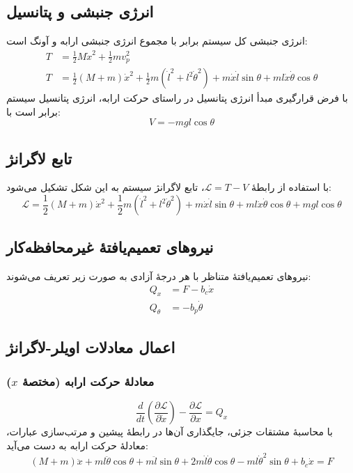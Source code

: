 \subsection{انرژی جنبشی و پتانسیل}

انرژی جنبشی کل سیستم برابر با مجموع انرژی جنبشی ارابه و آونگ است:
\begin{align*}
    T & = \frac{1}{2}M\dot{x}^2 + \frac{1}{2}m v_p^2                                                                                                          \\
    T & = \frac{1}{2}(M+m)\dot{x}^2 + \frac{1}{2}m \left( \dot{l}^2 + l^2\dot{\theta}^2 \right) + m\dot{x}\dot{l}\sin\theta + ml\dot{x}\dot{\theta}\cos\theta
\end{align*}
با فرض قرارگیری مبدأ انرژی پتانسیل در راستای حرکت ارابه، انرژی پتانسیل سیستم برابر است با:
\[
    V = -mgl\cos\theta
\]

\subsection{تابع لاگرانژ}

با استفاده از رابطهٔ $\mathcal{L} = T - V$، تابع لاگرانژ سیستم به این شکل تشکیل می‌شود:
\[
    \mathcal{L} = \frac{1}{2}(M+m)\dot{x}^2 + \frac{1}{2}m(\dot{l}^2 + l^2\dot{\theta}^2) + m\dot{x}\dot{l}\sin\theta + ml\dot{x}\dot{\theta}\cos\theta + mgl\cos\theta
\]

\subsection{نیروهای تعمیم‌یافتهٔ غیرمحافظه‌کار}
نیروهای تعمیم‌یافتهٔ متناظر با هر درجهٔ آزادی به صورت زیر تعریف می‌شوند:
\begin{align*}
    Q_x      & = F - b_c\dot{x}   \\
    Q_\theta & = -b_p\dot{\theta}
\end{align*}

\subsection{اعمال معادلات اویلر-لاگرانژ}

\subsubsection{معادلهٔ حرکت ارابه (مختصهٔ $x$)}
\[
    \frac{d}{dt}\left(\frac{\partial \mathcal{L}}{\partial \dot{x}}\right) - \frac{\partial \mathcal{L}}{\partial x} = Q_x
\]
با محاسبهٔ مشتقات جزئی، جایگذاری آن‌ها در رابطهٔ پیشین و مرتب‌سازی عبارات، معادلهٔ حرکت ارابه به دست می‌آید:
\[
    (M+m)\ddot{x} + ml\ddot{\theta}\cos\theta + m\ddot{l}\sin\theta + 2m\dot{l}\dot{\theta}\cos\theta - ml\dot{\theta}^2\sin\theta + b_c\dot{x} = F
\]

